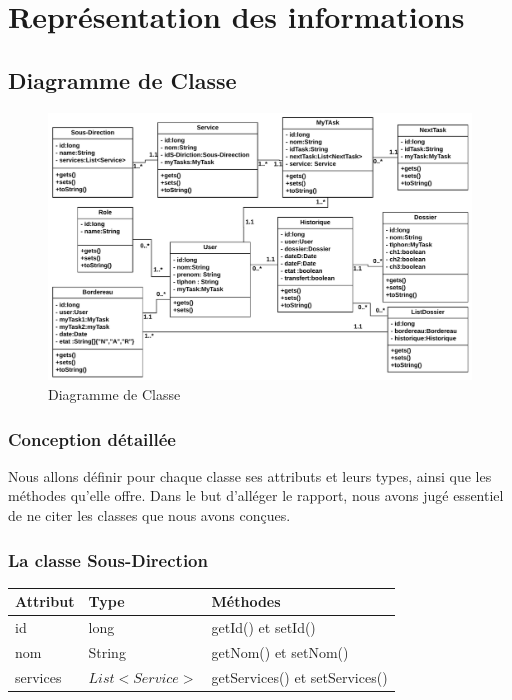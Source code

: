  \section{ Représentation des informations }
 \subsection{Diagramme de Classe}
\begin{figure}[H]
	\centering
	\includegraphics[width=1\linewidth,height=0.6\paperheight]{images/class01}
	\caption{Diagramme de Classe}
	\label{fig:class01}
\end{figure}

  \subsubsection{Conception détaillée} 
Nous allons définir pour chaque classe ses attributs et leurs types, ainsi que les méthodes qu’elle offre. Dans le but d’alléger le rapport, nous avons jugé essentiel de ne citer les classes que nous avons conçues.
 
 

\subsubsection*{La classe  Sous-Direction}
\begin{table}[H]
  \centering\setlength\tabcolsep{0.8cm}
	\begin{tabular}{|l|l|l|}
		\hline
		\textbf{Attribut}  & \textbf{Type} & \multicolumn{1}{l|}{\textbf{Méthodes}} \\ \hline
	
		id & long & getId() et setId()\\ \cline{1-2}
		nom & String  & getNom() et setNom() \\ \cline{1-2}
	services	& $ List<Service> $ & getServices() et setServices()   \\ \hline
	\end{tabular}
\end{table}
